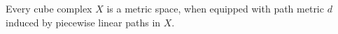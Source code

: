 \begin{thm}[{\cite[I.7.10]{MR1744486}}]
  Every cube complex \(X\) is a metric space, when equipped with path metric \(d\) induced by piecewise linear paths in \(X\).
\end{thm}



